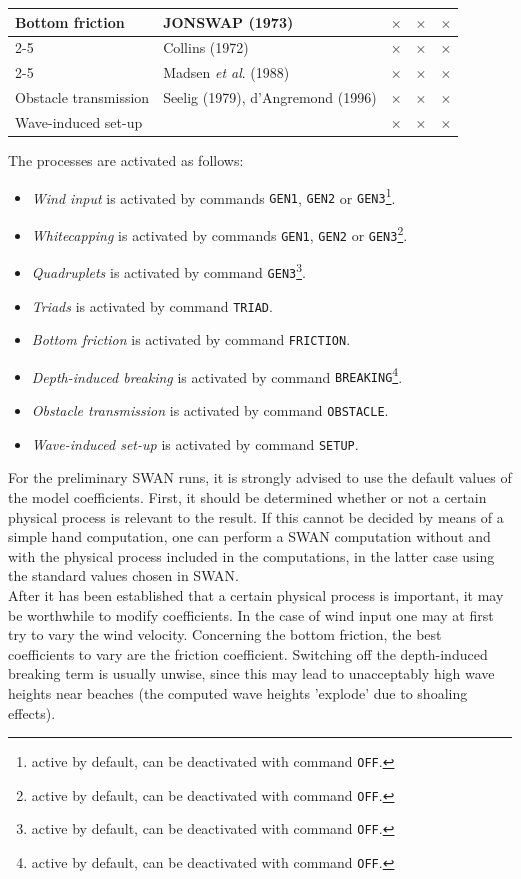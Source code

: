 \documentclass[12pt]{book}
\begin{document}
\begin{table}[htb]
\begin{center}
\begin{tabular}{|l | l | c | c | c|}
Bottom friction         & JONSWAP (1973)                         & $\times$ & $\times$ & $\times$ \\
\cline{2-5}
                        & Collins (1972)                         & $\times$ & $\times$ & $\times$ \\
\cline{2-5}
                        & Madsen {\it et al}. (1988)             & $\times$ & $\times$ & $\times$ \\
\hline
Obstacle transmission   & Seelig (1979), d'Angremond (1996)      & $\times$ & $\times$ & $\times$ \\
\hline
Wave-induced set-up     &                                        & $\times$ & $\times$ & $\times$ \\
\hline
\end{tabular}
\end{center}
\end{table}
\noindent
The processes are activated as follows:
\begin{itemize}
  \item {\it Wind input} is activated by commands {\tt GEN1}, {\tt GEN2} or {\tt GEN3}\footnote{active by default, can be deactivated with command {\tt OFF}.}.
  \item {\it Whitecapping} is activated by commands {\tt GEN1}, {\tt GEN2} or {\tt GEN3}\footnote{active by default, can be deactivated with command {\tt OFF}.}.
  \item {\it Quadruplets} is activated by command {\tt GEN3}\footnote{active by default, can be deactivated with command {\tt OFF}.}.
  \item {\it Triads} is activated by command {\tt TRIAD}.
  \item {\it Bottom friction} is activated by command {\tt FRICTION}.
  \item {\it Depth-induced breaking} is activated by command {\tt BREAKING}\footnote{active by default, can be deactivated with command {\tt OFF}.}.
  \item {\it Obstacle transmission} is activated by command {\tt OBSTACLE}.
  \item {\it Wave-induced set-up} is activated by command {\tt SETUP}.
\end{itemize}
For the preliminary SWAN runs, it is strongly advised to use the default values of the model coefficients. First, it
should be determined whether or not a certain physical process is relevant to the result. If this cannot be
decided by means of a simple hand computation, one can perform a SWAN computation without and with
the physical process included in the computations, in the latter case using the standard values chosen
in SWAN.
\\[2ex]
\noindent
After it has been established that a certain physical process is important, it may be worthwhile to modify
coefficients. In the case of wind input one may at first try to vary the wind velocity. Concerning the bottom
friction, the best coefficients to vary are the friction coefficient. Switching off the depth-induced breaking
term is usually unwise, since this may lead to unacceptably high wave heights near beaches (the
computed wave heights 'explode' due to shoaling effects).
\end{document}
